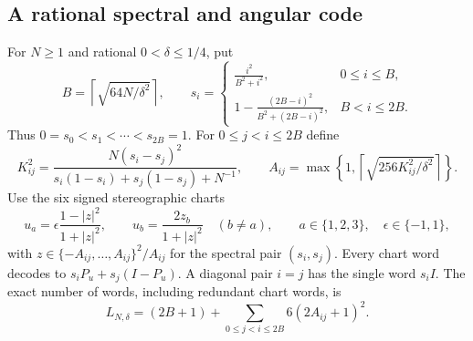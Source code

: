 \subsection{A rational spectral and angular code}
For $N\ge1$ and rational $0<\delta\le1/4$, put
\begin{equation}\label{eq:biasedspectralgrid75}
 B=\left\lceil\sqrt{64N/\delta^2}\right\rceil,\qquad
 s_i=\begin{cases}
 \displaystyle\frac{i^2}{B^2+i^2},&0\le i\le B,\\[2mm]
 \displaystyle1-\frac{(2B-i)^2}{B^2+(2B-i)^2},&B<i\le2B.
 \end{cases}
\end{equation}
Thus $0=s_0<s_1<\cdots<s_{2B}=1$. For $0\le j<i\le2B$ define
\begin{equation}\label{eq:biasedangulargrid75}
 K_{ij}^2=
 \frac{N(s_i-s_j)^2}
 {s_i(1-s_i)+s_j(1-s_j)+N^{-1}},\qquad
 A_{ij}=\max\left\{1,
      \left\lceil\sqrt{256K_{ij}^2/\delta^2}\right\rceil\right\}.
\end{equation}
Use the six signed stereographic charts
\begin{equation}\label{eq:biasedsphere75}
 u_a=\epsilon\frac{1-|z|^2}{1+|z|^2},\qquad
 u_b=\frac{2z_b}{1+|z|^2}\quad(b\ne a),\qquad
 a\in\{1,2,3\},\quad \epsilon\in\{-1,1\},
\end{equation}
with $z\in\{-A_{ij},\ldots,A_{ij}\}^2/A_{ij}$ for the spectral
pair $(s_i,s_j)$. Every chart word decodes to
$s_iP_u+s_j(I-P_u)$. A diagonal pair $i=j$ has the single word
$s_iI$. The exact number of words, including redundant chart words,
is
\begin{equation}\label{eq:biasedcapacity75}
 L_{N,\delta}=(2B+1)+
       \sum_{0\le j<i\le2B}6(2A_{ij}+1)^2.
\end{equation}

